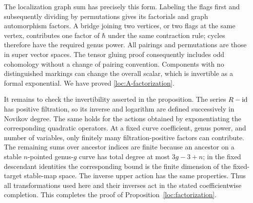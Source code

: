 The localization graph sum has precisely this form. Labeling the
flags first and subsequently dividing by permutations gives its
factorials and graph automorphism factors. A bridge joining two
vertices, or two flags at the same vertex, contributes one factor
of $\hbar$ under the same contraction rule; cycles therefore have
the required genus power. All pairings and permutations are those
in super vector spaces. The tensor gluing proof consequently
includes odd cohomology without a change of pairing convention.
Components with no distinguished markings can change the overall
scalar, which is invertible as a formal exponential. We have proved
\eqref{loc:A-factorization}.

It remains to check the invertibility asserted in the proposition.
The series $R-\operatorname{id}$ has positive filtration, so its inverse and
logarithm are defined successively in Novikov degree. The same holds
for the actions obtained by exponentiating the corresponding
quadratic operators. At a fixed curve coefficient, genus power,
and number of variables, only finitely many filtration-positive
factors can contribute. The remaining sums over ancestor indices
are finite because an ancestor on a stable $n$-pointed genus-$g$
curve has total degree at most $3g-3+n$; in the fixed descendant
identities the corresponding bound is the finite dimension of the
fixed-target stable-map space. The inverse upper action has the
same properties. Thus all transformations used here and their
inverses act in the stated coefficientwise completion. This completes
the proof of Proposition~\ref{loc:factorization}.
